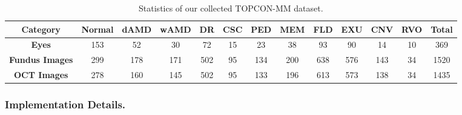 \documentclass[runningheads]{llncs}
\newcommand{\wdaicmnt}[1]{{\color[rgb]{0.9,0.1,0.1}{(WD:#1)}}}
\begin{document}






\begin{table}[t]
    \caption{Statistics of our collected TOPCON-MM dataset.}
    \label{tab:data-statistics}
    \centering
    \begin{adjustbox}{width=0.76\textwidth}
        \begin{tabular}{|c|c|c|c|c|c|c|c|c|c|c|c|c|}
        \hline
        \textbf{Category} & Normal & dAMD & wAMD & DR & CSC & PED & MEM & FLD & EXU & CNV & RVO & Total \\ 
        \hline
        \textbf{Eyes} & 153 & 52 & 30 & 72 & 15 & 23 & 38 & 93 & 90 & 14 & 10 & 369 \\
        \hline
        \textbf{Fundus Images} & 299 & 178 & 171 & 502 & 95 & 134 & 200 & 638 & 576 & 143 & 34 & 1520 \\
        \hline
        \textbf{OCT Images} & 278 & 160 & 145 & 502 & 95 & 133 & 196 & 613 & 573 & 138 & 34 & 1435 \\
        \hline
        \end{tabular}
    \end{adjustbox}
\end{table}

\subsubsection{Implementation Details.}
\end{document}
